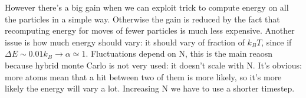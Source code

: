 \documentclass[a4paper, italian, openany]{book}
\begin{document}
However there's a big gain when we can exploit trick to compute energy on all the particles in a simple way. Otherwise the gain is reduced by the fact that recomputing energy for moves of fewer particles is much less expensive.\newline
Another issue is how much energy should vary: it should vary of fraction of $k_B T$, since if $\Delta E \sim 0.01 k_B \rightarrow \alpha \simeq 1$. Fluctuations depend on N, this is the main reaosn because hybrid monte Carlo is not very used: it doesn't scale with N. It's obvious: more atoms mean that a hit between two of them is more likely, so it's more likely the energy will vary a lot. Increasing N we have to use a shorter timestep.
\end{document}
